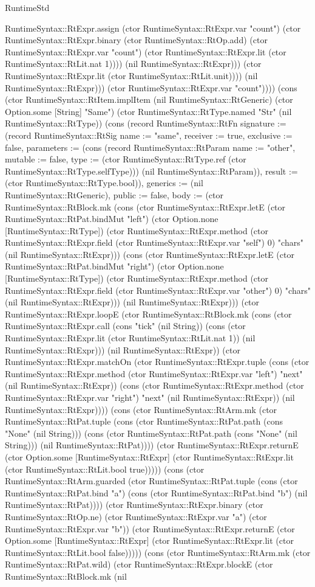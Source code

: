 \begin{lexlean}{RuntimeStd}
\begin{semanticmodule}
{RuntimeSyntax::RtExpr.assign (ctor RuntimeSyntax::RtExpr.var "count") (ctor RuntimeSyntax::RtExpr.binary (ctor RuntimeSyntax::RtOp.add) (ctor RuntimeSyntax::RtExpr.var "count") (ctor RuntimeSyntax::RtExpr.lit (ctor RuntimeSyntax::RtLit.nat 1)))) (nil RuntimeSyntax::RtExpr))) (ctor RuntimeSyntax::RtExpr.lit (ctor RuntimeSyntax::RtLit.unit)))) (nil RuntimeSyntax::RtExpr))) (ctor RuntimeSyntax::RtExpr.var "count"))})) (cons (ctor RuntimeSyntax::RtItem.implItem (nil RuntimeSyntax::RtGeneric) (ctor Option.some [String] "Same") (ctor RuntimeSyntax::RtType.named "Str" (nil RuntimeSyntax::RtType)) (cons (record RuntimeSyntax::RtFn {signature := (record RuntimeSyntax::RtSig {name := "same", receiver := true, exclusive := false, parameters := (cons (record RuntimeSyntax::RtParam {name := "other", mutable := false, type := (ctor RuntimeSyntax::RtType.ref (ctor RuntimeSyntax::RtType.selfType))}) (nil RuntimeSyntax::RtParam)), result := (ctor RuntimeSyntax::RtType.bool)}), generics := (nil RuntimeSyntax::RtGeneric), public := false, body := (ctor RuntimeSyntax::RtBlock.mk (cons (ctor RuntimeSyntax::RtExpr.letE (ctor RuntimeSyntax::RtPat.bindMut "left") (ctor Option.none [RuntimeSyntax::RtType]) (ctor RuntimeSyntax::RtExpr.method (ctor RuntimeSyntax::RtExpr.field (ctor RuntimeSyntax::RtExpr.var "self") 0) "chars" (nil RuntimeSyntax::RtExpr))) (cons (ctor RuntimeSyntax::RtExpr.letE (ctor RuntimeSyntax::RtPat.bindMut "right") (ctor Option.none [RuntimeSyntax::RtType]) (ctor RuntimeSyntax::RtExpr.method (ctor RuntimeSyntax::RtExpr.field (ctor RuntimeSyntax::RtExpr.var "other") 0) "chars" (nil RuntimeSyntax::RtExpr))) (nil RuntimeSyntax::RtExpr))) (ctor RuntimeSyntax::RtExpr.loopE (ctor RuntimeSyntax::RtBlock.mk (cons (ctor RuntimeSyntax::RtExpr.call (cons "tick" (nil String)) (cons (ctor RuntimeSyntax::RtExpr.lit (ctor RuntimeSyntax::RtLit.nat 1)) (nil RuntimeSyntax::RtExpr))) (nil RuntimeSyntax::RtExpr)) (ctor RuntimeSyntax::RtExpr.matchOn (ctor RuntimeSyntax::RtExpr.tuple (cons (ctor RuntimeSyntax::RtExpr.method (ctor RuntimeSyntax::RtExpr.var "left") "next" (nil RuntimeSyntax::RtExpr)) (cons (ctor RuntimeSyntax::RtExpr.method (ctor RuntimeSyntax::RtExpr.var "right") "next" (nil RuntimeSyntax::RtExpr)) (nil RuntimeSyntax::RtExpr)))) (cons (ctor RuntimeSyntax::RtArm.mk (ctor RuntimeSyntax::RtPat.tuple (cons (ctor RuntimeSyntax::RtPat.path (cons "None" (nil String))) (cons (ctor RuntimeSyntax::RtPat.path (cons "None" (nil String))) (nil RuntimeSyntax::RtPat)))) (ctor RuntimeSyntax::RtExpr.returnE (ctor Option.some [RuntimeSyntax::RtExpr] (ctor RuntimeSyntax::RtExpr.lit (ctor RuntimeSyntax::RtLit.bool true))))) (cons (ctor RuntimeSyntax::RtArm.guarded (ctor RuntimeSyntax::RtPat.tuple (cons (ctor RuntimeSyntax::RtPat.bind "a") (cons (ctor RuntimeSyntax::RtPat.bind "b") (nil RuntimeSyntax::RtPat)))) (ctor RuntimeSyntax::RtExpr.binary (ctor RuntimeSyntax::RtOp.ne) (ctor RuntimeSyntax::RtExpr.var "a") (ctor RuntimeSyntax::RtExpr.var "b")) (ctor RuntimeSyntax::RtExpr.returnE (ctor Option.some [RuntimeSyntax::RtExpr] (ctor RuntimeSyntax::RtExpr.lit (ctor RuntimeSyntax::RtLit.bool false))))) (cons (ctor RuntimeSyntax::RtArm.mk (ctor RuntimeSyntax::RtPat.wild) (ctor RuntimeSyntax::RtExpr.blockE (ctor RuntimeSyntax::RtBlock.mk (nil }
\end{semanticmodule}
\end{lexlean}
